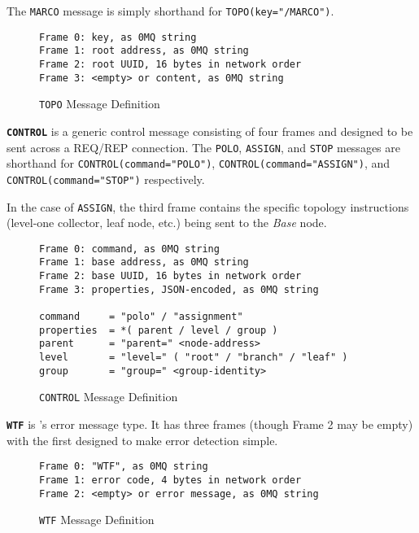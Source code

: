 The \texttt{MARCO} message is simply shorthand for \texttt{TOPO(key="/MARCO")}.

\begin{figure}[H]
\vspace{+10pt}
\begin{verbatim}
Frame 0: key, as 0MQ string
Frame 1: root address, as 0MQ string
Frame 2: root UUID, 16 bytes in network order
Frame 3: <empty> or content, as 0MQ string
\end{verbatim}
\vspace{-20pt}
\caption{\texttt{TOPO} Message Definition}
\label{fig:message_topo}
\end{figure}

\textbf{\texttt{CONTROL}} is a generic control message consisting of four frames and designed to be sent across a
REQ/REP connection. The \texttt{POLO}, \texttt{ASSIGN}, and \texttt{STOP} messages are shorthand for
\texttt{CONTROL(command="POLO")}, \texttt{CONTROL(command="ASSIGN")}, and \texttt{CONTROL(command="STOP")} respectively.

In the case of \texttt{ASSIGN}, the third frame contains the specific topology instructions (level-one collector, leaf
node, etc.) being sent to the \textit{Base} node.

\begin{figure}[H]
\vspace{+10pt}
\begin{verbatim}
Frame 0: command, as 0MQ string
Frame 1: base address, as 0MQ string
Frame 2: base UUID, 16 bytes in network order
Frame 3: properties, JSON-encoded, as 0MQ string

command     = "polo" / "assignment"
properties  = *( parent / level / group )
parent      = "parent=" <node-address>
level       = "level=" ( "root" / "branch" / "leaf" )
group       = "group=" <group-identity>
\end{verbatim}
\vspace{-20pt}
\caption{\texttt{CONTROL} Message Definition}
\label{fig:message_control}
\end{figure}

\textbf{\texttt{WTF}} is \dcamp's error message type. It has three frames (though Frame 2 may be empty) with the first
designed to make error detection simple.

\begin{figure}[H]
\vspace{+10pt}
\begin{verbatim}
Frame 0: "WTF", as 0MQ string
Frame 1: error code, 4 bytes in network order
Frame 2: <empty> or error message, as 0MQ string
\end{verbatim}
\vspace{-20pt}
\caption{\texttt{WTF} Message Definition}
\label{fig:message_wtf}
\end{figure}

